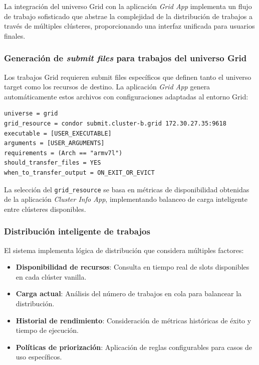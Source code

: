La integración del universo Grid con la aplicación \textit{Grid App} implementa un flujo de trabajo sofisticado que abstrae la complejidad de la distribución de trabajos a través de múltiples clústeres, proporcionando una interfaz unificada para usuarios finales.

\subsubsection{Generación de \textit{submit files} para trabajos del universo Grid}
\noindent

Los trabajos Grid requieren submit files específicos que definen tanto el universo target como los recursos de destino. La aplicación \textit{Grid App} genera automáticamente estos archivos con configuraciones adaptadas al entorno Grid:

\begin{verbatim}
universe = grid
grid_resource = condor submit.cluster-b.grid 172.30.27.35:9618
executable = [USER_EXECUTABLE]
arguments = [USER_ARGUMENTS]
requirements = (Arch == "armv7l")
should_transfer_files = YES
when_to_transfer_output = ON_EXIT_OR_EVICT
\end{verbatim}

La selección del \texttt{grid\_resource} se basa en métricas de disponibilidad obtenidas de la aplicación \textit{Cluster Info App}, implementando balanceo de carga inteligente entre clústeres disponibles.

\subsubsection{Distribución inteligente de trabajos}
\noindent

El sistema implementa lógica de distribución que considera múltiples factores:

\begin{itemize}
	\item \textbf{Disponibilidad de recursos}: Consulta en tiempo real de slots disponibles en cada clúster vanilla.

	\item \textbf{Carga actual}: Análisis del número de trabajos en cola para balancear la distribución.

	\item \textbf{Historial de rendimiento}: Consideración de métricas históricas de éxito y tiempo de ejecución.

	\item \textbf{Políticas de priorización}: Aplicación de reglas configurables para casos de uso específicos.
\end{itemize}

